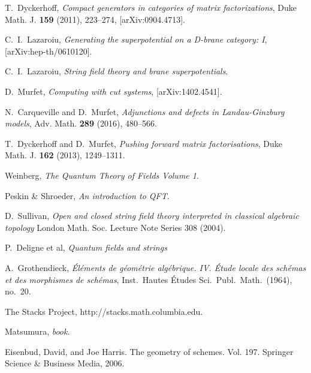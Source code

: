 \documentclass[english,letter paper,12pt,leqno]{article}
\theoremstyle{example}
\numberwithin{equation}{section}
\begin{document}
\newpage


\providecommand{\bysame}{\leavevmode\hbox to3em{\hrulefill}\thinspace}
\providecommand{\href}[2]{#2}
\begin{thebibliography}{BHLS03}
  
T.~Dyckerhoff, \textsl{Compact generators in categories of matrix factorizations},
  Duke Math. J. \textbf{159} (2011), 223--274,
  \href{http://arxiv.org/abs/0904.4713}{[arXiv:0904.4713]}.
  
C.~I.~Lazaroiu, \textsl{Generating the superpotential on a D-brane category: I}, [arXiv:hep-th/0610120].

C.~I.~Lazaroiu, \textsl{String field theory and brane superpotentials}.
  
D.~Murfet, \textsl{Computing with cut systems}, \href{http://arxiv.org/abs/1402.4541}{[arXiv:1402.4541]}.

N.~Carqueville and D.~Murfet, \textsl{Adjunctions and defects in Landau-Ginzburg models}, Adv. Math. \textbf{289} (2016), 480--566.

T.~Dyckerhoff and D.~Murfet, \textsl{Pushing forward matrix factorisations}, Duke Math. J. \textbf{162} (2013), 1249--1311.

Weinberg, \textsl{The Quantum Theory of Fields Volume 1}.

Peskin \& Shroeder, \textsl{An introduction to QFT}.

D.~Sullivan, \textsl{Open and closed string field theory interpreted in classical algebraic topology} London Math. Soc. Lecture Note Series 308 (2004).

P.~Deligne et al, \textsl{Quantum fields and strings}

A.~Grothendieck, \textsl{\'{E}l\'ements de g\'eom\'etrie alg\'ebrique. {IV}. \'{E}tude
  locale des sch\'emas et des morphismes de sch\'emas}, Inst.~Hautes \'Etudes
  Sci.~Publ.~Math.~(1964), no.~20.

The Stacks Project, \href{http://stacks.math.columbia.edu/}{http://stacks.math.columbia.edu}.

Matsumura, \emph{book}.

Eisenbud, David, and Joe Harris. The geometry of schemes. Vol. 197. Springer Science \& Business Media, 2006.

\end{thebibliography}
\end{document}
